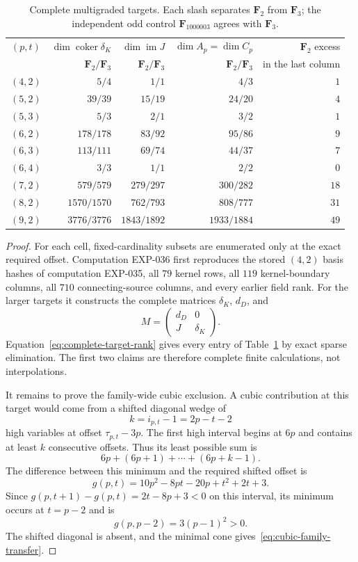 \documentclass[11pt]{article}
\theoremstyle{definition}
\theoremstyle{remark}
\begin{document}
\begin{table}[ht]
\centering
\small
\begin{tabular}{@{}crrrr@{}}
\toprule
$(p,t)$ & $\dim\operatorname{coker}\delta_K$ & $\dim\operatorname{im}J$ & $\dim A_p=\dim C_p$ & $\mathbf F_2$ excess\\
 & $\mathbf F_2/\mathbf F_3$ & $\mathbf F_2/\mathbf F_3$ & $\mathbf F_2/\mathbf F_3$ & in the last column\\
\midrule
$(4,2)$ & $5/4$ & $1/1$ & $4/3$ & $1$\\
$(5,2)$ & $39/39$ & $15/19$ & $24/20$ & $4$\\
$(5,3)$ & $5/3$ & $2/1$ & $3/2$ & $1$\\
$(6,2)$ & $178/178$ & $83/92$ & $95/86$ & $9$\\
$(6,3)$ & $113/111$ & $69/74$ & $44/37$ & $7$\\
$(6,4)$ & $3/3$ & $1/1$ & $2/2$ & $0$\\
$(7,2)$ & $579/579$ & $279/297$ & $300/282$ & $18$\\
$(8,2)$ & $1570/1570$ & $762/793$ & $808/777$ & $31$\\
$(9,2)$ & $3776/3776$ & $1843/1892$ & $1933/1884$ & $49$\\
\bottomrule
\end{tabular}
\caption{Complete multigraded targets. Each slash separates $\mathbf F_2$ from $\mathbf F_3$;
the independent odd control $\mathbf F_{1000003}$ agrees with $\mathbf F_3$.}
\label{tab:torsion-targets}
\end{table}

\begin{proof}
For each cell, fixed-cardinality subsets are enumerated only at the exact required offset.
Computation EXP-036 first reproduces the stored $(4,2)$ basis hashes of computation EXP-035, all
$79$ kernel rows, all $119$ kernel-boundary columns, all $710$ connecting-source columns, and every
earlier field rank. For
the larger targets it constructs the complete matrices $\delta_K$, $d_D$, and
\[
M=\begin{pmatrix}d_D&0\\J&\delta_K\end{pmatrix}.
\]
Equation~\eqref{eq:complete-target-rank} gives every entry of Table~\ref{tab:torsion-targets} by
exact sparse elimination. The first two claims are therefore complete finite calculations, not
interpolations.

It remains to prove the family-wide cubic exclusion. A cubic contribution at this target would
come from a shifted diagonal wedge of
\[
k=i_{p,t}-1=2p-t-2
\]
high variables at offset $\tau_{p,t}-3p$. The first high interval begins at $6p$ and contains at
least $k$ consecutive offsets. Thus its least possible sum is
\[
6p+(6p+1)+\cdots+(6p+k-1).
\]
The difference between this minimum and the required shifted offset is
\begin{equation}
g(p,t)=10p^2-8pt-20p+t^2+2t+3.
\label{eq:cubic-family-gap}
\end{equation}
Since $g(p,t+1)-g(p,t)=2t-8p+3<0$ on this interval, its minimum occurs at $t=p-2$ and is
\[
g(p,p-2)=3(p-1)^2>0.
\]
The shifted diagonal is absent, and the minimal cone gives~\eqref{eq:cubic-family-transfer}.
\end{proof}
\end{document}
